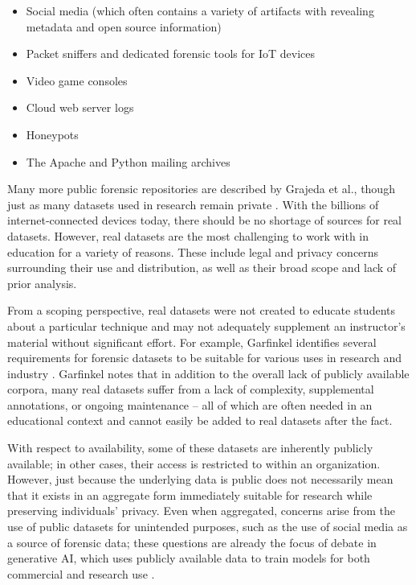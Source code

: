 \documentclass[letterpaper,12pt]{report}
\def\tightlist{}
\begin{document}
\begin{itemize}
\tightlist
\item
  Social media (which often contains a variety of artifacts with
  revealing metadata and open source information)
  \cite{baggiliDataSourcesAdvancing2015}
\item
  Packet sniffers and dedicated forensic tools for IoT devices
  \cite{meffertForensicStateAcquisition2017}
\item
  Video game consoles
  \cite{grajedaAvailabilityDatasetsDigital2017,pessolanoForensicAnalysisNintendo2019}
\item
  Cloud web server logs \cite{rahmanNewWebForensic2020}
\item
  Honeypots \cite{mochForensicImageGenerator2009}
\item
  The Apache and Python mailing archives
  \cite{grajedaAvailabilityDatasetsDigital2017}
\end{itemize}

Many more public forensic repositories are described by Grajeda et al.,
though just as many datasets used in research remain private
\cite{grajedaAvailabilityDatasetsDigital2017}. With the billions of
internet-connected devices today, there should be no shortage of sources
for real datasets. However, real datasets are the most challenging to
work with in education for a variety of reasons. These include legal and
privacy concerns surrounding their use and distribution, as well as
their broad scope and lack of prior analysis.

From a scoping perspective, real datasets were not created to educate
students about a particular technique and may not adequately supplement
an instructor's material without significant effort. For example,
Garfinkel identifies several requirements for forensic datasets to be
suitable for various uses in research and industry
\cite{garfinkelForensicCorporaChallenge2007}. Garfinkel notes that
in addition to the overall lack of publicly available corpora, many real
datasets suffer from a lack of complexity, supplemental annotations, or
ongoing maintenance -- all of which are often needed in an educational
context and cannot easily be added to real datasets after the fact.

With respect to availability, some of these datasets are inherently
publicly available; in other cases, their access is restricted to within
an organization. However, just because the underlying data is public
does not necessarily mean that it exists in an aggregate form
immediately suitable for research while preserving individuals' privacy.
Even when aggregated, concerns arise from the use of public datasets for
unintended purposes, such as the use of social media as a source of
forensic data; these questions are already the focus of debate in
generative AI, which uses publicly available data to train models for
both commercial and research use
\cite{avrahamiOwnershipCreativityGenerative2021,eshraghianHumanOwnershipArtificial2020,rooseAIgeneratedPictureWon2022}.
\end{document}
